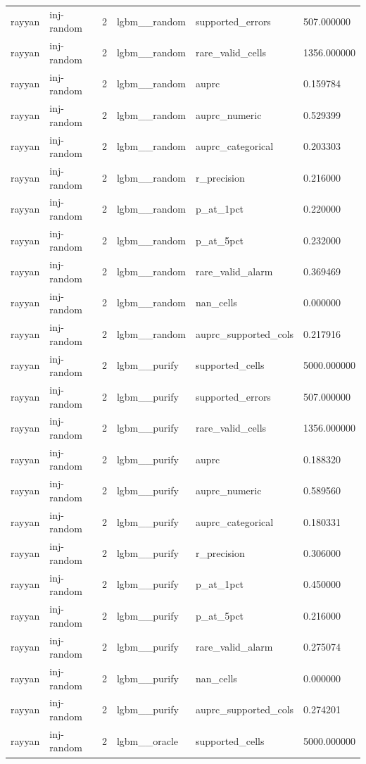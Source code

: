 \begin{tabular}{llllll}
rayyan & inj-random & 2 & lgbm\_\_random & supported\_errors & 507.000000 \\
rayyan & inj-random & 2 & lgbm\_\_random & rare\_valid\_cells & 1356.000000 \\
rayyan & inj-random & 2 & lgbm\_\_random & auprc & 0.159784 \\
rayyan & inj-random & 2 & lgbm\_\_random & auprc\_numeric & 0.529399 \\
rayyan & inj-random & 2 & lgbm\_\_random & auprc\_categorical & 0.203303 \\
rayyan & inj-random & 2 & lgbm\_\_random & r\_precision & 0.216000 \\
rayyan & inj-random & 2 & lgbm\_\_random & p\_at\_1pct & 0.220000 \\
rayyan & inj-random & 2 & lgbm\_\_random & p\_at\_5pct & 0.232000 \\
rayyan & inj-random & 2 & lgbm\_\_random & rare\_valid\_alarm & 0.369469 \\
rayyan & inj-random & 2 & lgbm\_\_random & nan\_cells & 0.000000 \\
rayyan & inj-random & 2 & lgbm\_\_random & auprc\_supported\_cols & 0.217916 \\
rayyan & inj-random & 2 & lgbm\_\_purify & supported\_cells & 5000.000000 \\
rayyan & inj-random & 2 & lgbm\_\_purify & supported\_errors & 507.000000 \\
rayyan & inj-random & 2 & lgbm\_\_purify & rare\_valid\_cells & 1356.000000 \\
rayyan & inj-random & 2 & lgbm\_\_purify & auprc & 0.188320 \\
rayyan & inj-random & 2 & lgbm\_\_purify & auprc\_numeric & 0.589560 \\
rayyan & inj-random & 2 & lgbm\_\_purify & auprc\_categorical & 0.180331 \\
rayyan & inj-random & 2 & lgbm\_\_purify & r\_precision & 0.306000 \\
rayyan & inj-random & 2 & lgbm\_\_purify & p\_at\_1pct & 0.450000 \\
rayyan & inj-random & 2 & lgbm\_\_purify & p\_at\_5pct & 0.216000 \\
rayyan & inj-random & 2 & lgbm\_\_purify & rare\_valid\_alarm & 0.275074 \\
rayyan & inj-random & 2 & lgbm\_\_purify & nan\_cells & 0.000000 \\
rayyan & inj-random & 2 & lgbm\_\_purify & auprc\_supported\_cols & 0.274201 \\
rayyan & inj-random & 2 & lgbm\_\_oracle & supported\_cells & 5000.000000 \\

\end{tabular}
